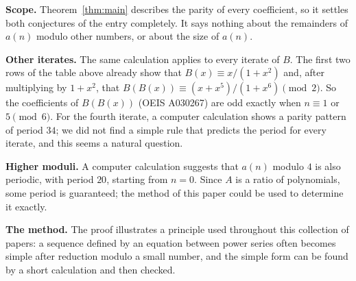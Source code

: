 \documentclass[11pt,a4paper]{article}
\theoremstyle{definition}
\theoremstyle{remark}
\newcommand{\para}[1]{\par\medskip\noindent\textbf{#1}\enspace}
\begin{document}
\para{Scope.} Theorem~\ref{thm:main} describes the parity of every coefficient, so it settles both conjectures of the
entry completely. It says nothing about the remainders of $a(n)$ modulo other numbers, or about the size of $a(n)$.

\para{Other iterates.} The same calculation applies to every iterate of $B$. The first two rows of the table above
already show that $B(x)\equiv x/(1+x^2)$ and, after multiplying by $1+x^2$, that
$B(B(x))\equiv(x+x^5)/(1+x^6)\pmod2$. So the coefficients of $B(B(x))$ (OEIS A030267) are odd exactly when
$n\equiv1$ or $5\pmod 6$. For the fourth iterate, a computer calculation shows a parity pattern of period $34$; we did not
find a simple rule that predicts the period for every iterate, and this seems a natural question.

\para{Higher moduli.} A computer calculation suggests that $a(n)$ modulo $4$ is also periodic, with period $20$,
starting from $n=0$. Since $A$ is a ratio of polynomials, some period is guaranteed; the method of this paper could be used to
determine it exactly.

\para{The method.} The proof illustrates a principle used throughout this collection of papers: a sequence defined
by an equation between power series often becomes simple after reduction modulo a small number, and the simple form can
be found by a short calculation and then checked.
\end{document}
